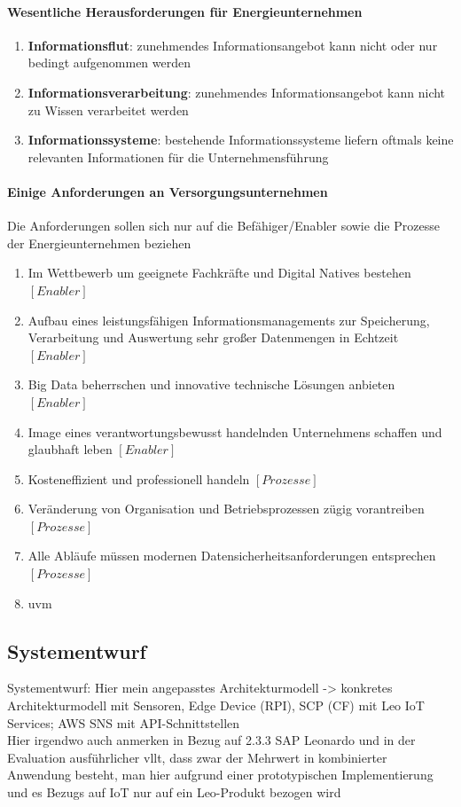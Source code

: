 \paragraph{Wesentliche Herausforderungen für Energieunternehmen \citep[S. 21]{Doleski2016}}
\begin{enumerate}
  \item \textbf{Informationsflut}: zunehmendes Informationsangebot kann nicht oder nur bedingt aufgenommen werden
  \item \textbf{Informationsverarbeitung}: zunehmendes Informationsangebot kann nicht zu Wissen verarbeitet werden
  \item \textbf{Informationssysteme}: bestehende Informationssysteme liefern oftmals keine relevanten Informationen für die Unternehmensführung
\end{enumerate}
%


\paragraph{Einige Anforderungen an Versorgungsunternehmen}
Die Anforderungen sollen sich nur auf die Befähiger/Enabler sowie die Prozesse der Energieunternehmen beziehen
\begin{enumerate}
  \item Im Wettbewerb um geeignete Fachkräfte und Digital Natives bestehen $[Enabler]$
  \item Aufbau eines leistungsfähigen Informationsmanagements zur Speicherung, Verarbeitung und Auswertung sehr großer Datenmengen in Echtzeit $[Enabler]$
  \item Big Data beherrschen und innovative technische Lösungen anbieten $[Enabler]$
  \item Image eines verantwortungsbewusst handelnden Unternehmens schaffen und glaubhaft leben $[Enabler]$
  \item Kosteneffizient und professionell handeln $[Prozesse]$
  \item Veränderung von Organisation und Betriebsprozessen zügig vorantreiben $[Prozesse]$
  \item Alle Abläufe müssen modernen Datensicherheitsanforderungen entsprechen $[Prozesse]$
  \item uvm
\end{enumerate}


\subsection{Systementwurf}
Systementwurf: Hier mein angepasstes Architekturmodell -> konkretes Architekturmodell mit Sensoren, Edge Device (RPI), SCP (CF) mit Leo IoT Services; AWS SNS mit API-Schnittstellen
\\Hier irgendwo auch anmerken in Bezug auf 2.3.3 SAP Leonardo und in der Evaluation ausführlicher vllt, dass zwar der Mehrwert in kombinierter Anwendung besteht, man hier aufgrund einer prototypischen Implementierung und es Bezugs auf IoT nur auf ein Leo-Produkt bezogen wird

